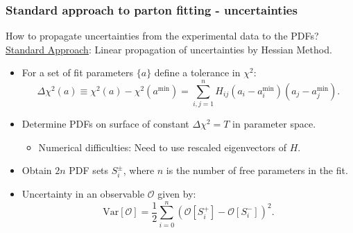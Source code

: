 \documentclass[10pt]{beamer}
\newcommand{\be}{\begin{equation*}}
\newcommand{\ee}{\end{equation*}}
\newcommand{\vso}{\vskip15pt}
\begin{document}
\begin{frame}
\frametitle{Standard approach to parton fitting - uncertainties}
How to propagate uncertainties from the experimental data to the PDFs?
\underline{Standard Approach}: Linear propagation of uncertainties by Hessian Method.
\begin{itemize}
		\item<1->For a set of fit parameters $\{ a\} $ define a tolerance in $\chi^2$:
		\be \Delta\chi^2(a) \equiv \chi^2(a) - \chi^2(a^\mathrm{min}) = \sum^n_{i,j=1}H_{ij}(a_i-a_i^\mathrm{min})(a_j - a_j^\mathrm{min}). \ee
		\item<1-> Determine PDFs on surface of constant $\Delta\chi^2=T$ in parameter space.
		\begin{itemize}
			\item<1-> Numerical difficulties: Need to use rescaled eigenvectors of $H$.
		\end{itemize}
		\item<1-> Obtain $2n$ PDF sets $S_i^\pm$, where $n$ is the number of free parameters in the fit. \vso
		\item<1-> Uncertainty in an observable $\mathcal{O}$ given by:
		\be \mathrm{Var}[\mathcal{O}] = \frac{1}{2}\sum_{i=0}^n (\mathcal{O}[S_i^+] - \mathcal{O}[S_i^-] )^2.\ee
\end{itemize}

\end{frame}
\end{document}
